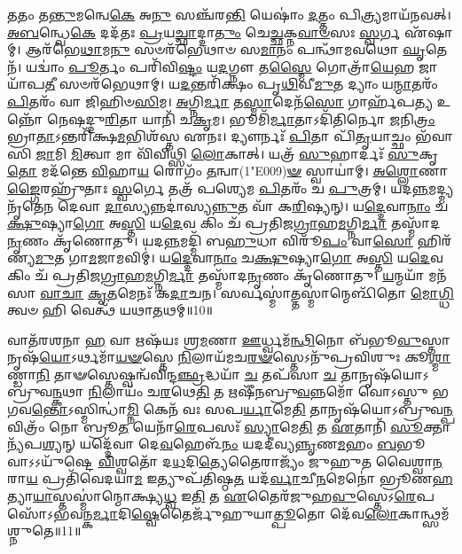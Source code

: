 \-\ul{𑌤}\-𑌤𑌂 𑌤\-\ul{𑌨𑍍𑌤𑍁}\-𑌮𑌨𑍍𑌵𑍇\-\ul{𑌕𑍇} 𑌅\-\ul{𑌨𑍁} 𑌸𑌞𑍍𑌚᳴𑌰\-\ul{𑌨𑍍𑌤𑌿} 𑌯𑍇𑌷𑌾𑌂॑ \ul{𑌦}\-𑌤𑍍𑌤𑌂 𑌪𑌿\-\ul{𑌤𑍍𑌰𑍍𑌯}\-𑌮𑌾𑌯᳴𑌨𑌵𑌤𑍍। 
\-\ul{𑌅}\-\-\ul{𑌬}\-𑌨𑍍𑌧𑍍𑌵𑍇\-\ul{𑌕𑍇} 𑌦𑌦᳴𑌤𑌃 \ul{𑌪𑍍𑌰}\-𑌯\-\ul{𑌚𑍍𑌛𑌾}\-𑌦𑍍𑌦𑌾\-\ul{𑌤𑍁𑌂} 𑌚𑍇\-\ul{𑌚𑍍𑌛}\-𑌕𑍍𑌨\-\ul{𑌵𑌾}\-\-\ul{𑍞}\-𑌸𑌃 \ul{𑌸𑍍𑌵}\-𑌰𑍍𑌗 𑌏᳴𑌷𑌾𑌮𑍍। 
𑌆𑌰᳴𑌭𑍇\-\ul{𑌥𑌾}\-𑌮\-\ul{𑌨𑍁} 𑌸𑍞𑌰᳴𑌭𑍇𑌥𑌾𑍞 𑌸\-\ul{𑌮𑌾}\-𑌨𑌂 𑌪𑌨𑍍𑌥𑌾᳴𑌮𑌵𑌥𑍋 \ul{𑌘𑍃}\-𑌤𑍇𑌨᳴। 
𑌯𑌦𑍍𑌵𑌾𑌂॑ \ul{𑌪𑍂}\-𑌰𑍍𑌤𑌂 𑌪𑌰𑌿᳴𑌵𑌿\-\ul{𑌷𑍍𑌟𑌂} 𑌯\-\ul{𑌦}\-𑌗𑍍𑌨𑍗 𑌤\-\ul{𑌸𑍍𑌮𑍈} 𑌗𑍋𑌤𑍍𑌰𑌾᳴\-\ul{𑌯𑍇}\-𑌹 𑌜𑌾𑌯𑌾᳴𑌪\-\ul{𑌤𑍀} 𑌸𑍞𑌰᳴𑌭𑍇𑌥𑌾𑌮𑍍। 
𑌯\-\ul{𑌦}\-𑌨𑍍𑌤𑌰𑌿᳴𑌕𑍍𑌷𑌂 𑌪𑍃\-\ul{𑌥𑌿}\-𑌵𑍀\-\ul{𑌮𑍁}\-𑌤 𑌦𑍍𑌯𑌾𑌂 𑌯\-\ul{𑌨𑍍𑌮𑌾}\-𑌤𑌰𑌂᳴ \ul{𑌪𑌿}\-𑌤𑌰𑌂᳴ 𑌵𑌾 𑌜𑌿𑌹𑌿𑍞\-\ul{𑌸𑌿}\-𑌮। 
\-\ul{𑌅}\-𑌗𑍍𑌨𑌿\-\ul{𑌰𑍍𑌮𑌾} 𑌤\-\ul{𑌸𑍍𑌮𑌾}\-𑌦𑍇𑌨᳴\-\ul{𑌸𑍋} 𑌗𑌾𑌰𑍍\mbox{}𑌹᳴𑌪\-\ul{𑌤𑍍𑌯} 𑌉𑌨𑍍𑌨𑍋᳴ 𑌨𑍇𑌷𑌦𑍍𑌦𑍁\-\ul{𑌰𑌿}\-𑌤𑌾 𑌯𑌾𑌨𑌿᳴ 𑌚\-\ul{𑌕𑍃}\-𑌮। 
𑌭𑍂𑌮𑌿᳴\-\ul{𑌰𑍍𑌮𑌾}\-𑌤𑌾𑌽𑌦𑌿᳴𑌤𑌿𑌰𑍍𑌨𑍋 \ul{𑌜}\-𑌨𑌿\-\ul{𑌤𑍍𑌰𑌂} 𑌭𑍍𑌰𑌾\-\ul{𑌤𑌾}\-𑌽𑌨𑍍𑌤𑌰𑌿᳴𑌕𑍍𑌷\-\ul{𑌮}\-𑌭𑌿𑌶᳴𑌸𑍍𑌤 𑌏𑌨𑌃। 
𑌦𑍍𑌯𑍗𑌰𑍍𑌨𑌃᳴ \ul{𑌪𑌿}\-𑌤𑌾 𑌪𑌿᳴\-\ul{𑌤𑍃}\-𑌯𑌾𑌚𑍍𑌛𑌂 𑌭᳴𑌵𑌾𑌸𑌿 \ul{𑌜𑌾}\-𑌮𑌿 \ul{𑌮𑌿}\-𑌤𑍍𑌵𑌾 𑌮𑌾 𑌵𑌿᳴𑌵𑌿𑌥𑍍𑌸𑌿 \ul{𑌲𑍋}\-𑌕𑌾𑌤𑍍। 
𑌯𑌤𑍍𑌰᳴ \ul{𑌸𑍁}\-𑌹𑌾𑌰𑍍𑌦𑌃᳴ \ul{𑌸𑍁}\-𑌕𑍃\-\ul{𑌤𑍋} 𑌮𑌦᳴𑌨𑍍𑌤𑍇 \ul{𑌵𑌿}\-𑌹𑌾\-\ul{𑌯} 𑌰𑍋𑌗𑌂᳴ \ul{𑌤}\-𑌨𑍍𑌵𑌾(1\char"E009)\-\ul{𑍟} 𑌸𑍍𑌵𑌾𑌯𑌾॑𑌮𑍍। 
\-\ul{𑌅}\-\-\ul{𑌶𑍍𑌲𑍋}\-𑌣𑌾\-\ul{𑌙𑍍𑌗𑍈}\-𑌰𑌹𑍍𑌰𑍁᳴𑌤𑌾𑌃 \ul{𑌸𑍍𑌵}\-𑌰𑍍𑌗𑍇 𑌤𑌤𑍍𑌰᳴ 𑌪𑌶𑍍𑌯𑍇𑌮 \ul{𑌪𑌿}\-𑌤𑌰𑌂᳴ 𑌚 \ul{𑌪𑍁}\-𑌤𑍍𑌰𑌮𑍍। 
𑌯𑌦\-\ul{𑌨𑍍𑌨}\-𑌮𑌦𑍍𑌮𑍍𑌯𑌨𑍃᳴𑌤𑍇𑌨 𑌦𑍇𑌵𑌾 \ul{𑌦𑌾}\-𑌸𑍍𑌯𑌨𑍍𑌨𑌦𑌾॑𑌸𑍍𑌯\-\ul{𑌨𑍍𑌨𑍁}\-𑌤 𑌵𑌾᳴ 𑌕\-\ul{𑌰𑌿}\-𑌷𑍍𑌯𑌨𑍍। 
𑌯\-\ul{𑌦𑍍𑌦𑍇}\-𑌵𑌾\-\ul{𑌨𑌾𑌂} 𑌚\-\ul{𑌕𑍍𑌷𑍁}\-𑌷𑍍𑌯𑌾\-\ul{𑌗𑍋} 𑌅\-\ul{𑌸𑍍𑌤𑌿} 𑌯\-\ul{𑌦𑍇}\-𑌵 𑌕𑌿𑌂 𑌚᳴ 𑌪𑍍𑌰𑌤𑌿𑌜\-\ul{𑌗𑍍𑌰𑌾}\-𑌹\-\ul{𑌮}\-𑌗𑍍𑌨𑌿\-\ul{𑌰𑍍𑌮𑌾} 𑌤𑌸𑍍𑌮𑌾᳴𑌦\-\ul{𑌨𑍃}\-𑌣𑌂 𑌕𑍃᳴𑌣𑍋𑌤𑍁। 
𑌯𑌦\-\ul{𑌨𑍍𑌨}\-𑌮𑌦𑍍𑌮𑌿᳴ 𑌬\-\ul{𑌹𑍁}\-𑌧𑌾 𑌵𑌿𑌰𑍂᳴\-\ul{𑌪𑌂} 𑌵𑌾\-\ul{𑌸𑍋} 𑌹𑌿𑌰᳴𑌣𑍍𑌯\-\ul{𑌮𑍁}\-𑌤 𑌗𑌾\-\ul{𑌮}\-𑌜𑌾𑌮𑌵𑌿𑌮𑍍॑। 
𑌯\-\ul{𑌦𑍍𑌦𑍇}\-𑌵𑌾\-\ul{𑌨𑌾𑌂} 𑌚\-\ul{𑌕𑍍𑌷𑍁}\-𑌷𑍍𑌯𑌾\-\ul{𑌗𑍋} 𑌅\-\ul{𑌸𑍍𑌤𑌿} 𑌯\-\ul{𑌦𑍇}\-𑌵 𑌕𑌿𑌂 𑌚᳴ 𑌪𑍍𑌰𑌤𑌿𑌜\-\ul{𑌗𑍍𑌰𑌾}\-𑌹\-\ul{𑌮}\-𑌗𑍍𑌨𑌿\-\ul{𑌰𑍍𑌮𑌾} 𑌤𑌸𑍍𑌮𑌾᳴𑌦\-\ul{𑌨𑍃}\-𑌣𑌂 𑌕𑍃᳴𑌣𑍋𑌤𑍁। 
\-\ul{𑌯}\-𑌨𑍍𑌮𑌯𑌾᳴ 𑌮𑌨᳴𑌸𑌾 \ul{𑌵𑌾}\-\-\ul{𑌚𑌾} \ul{𑌕𑍃}\-\-\ul{𑌤}\-𑌮𑍇𑌨𑌃᳴ 𑌕\-\ul{𑌦𑌾}\-𑌚𑌨। 
𑌸𑌰𑍍𑌵𑌸𑍍𑌮𑌾॑𑌤𑍍𑌤𑌸𑍍𑌮𑌾॑𑌨𑍍𑌮𑍇𑌳𑌿᳴𑌤𑍋 \ul{𑌮𑍋}\-\-\ul{𑌗𑍍𑌧𑌿} 𑌤𑍍𑌵𑍞 𑌹𑌿 𑌵𑍇𑌤𑍍𑌥᳴ 𑌯𑌥𑌾\-\ul{𑌤}\-𑌥𑌮𑍍॥10॥\anuvakamend

𑌵𑌾𑌤᳴𑌰𑌶𑌨𑌾 \ul{𑌹} 𑌵𑌾 𑌋𑌷᳴𑌯𑌃 𑌶𑍍𑌰\-\ul{𑌮}\-𑌣𑌾 \ul{𑌊}\-𑌰𑍍𑌧𑍍𑌵𑌮᳴\-\ul{𑌨𑍍𑌥𑌿}\-𑌨𑍋 𑌬᳴𑌭𑍂\-\ul{𑌵𑍁}\-𑌸𑍍𑌤𑌾𑌨𑍃𑌷᳴\-\ul{𑌯𑍋}\-\-𑌽𑌰𑍍𑌥𑌮𑌾᳴\-\ul{𑌯}\-\-\ul{𑍟}\-𑌸𑍍𑌤𑍇 \ul{𑌨𑌿}\-𑌲𑌾𑌯᳴𑌮𑌚\-\ul{𑌰}\-\-\ul{𑍟}\-𑌸𑍍𑌤𑍇𑌽𑌨𑍁᳴𑌪𑍍𑌰𑌵𑌿𑌶𑍁𑌃 𑌕𑍂\-\ul{𑌶𑍍𑌮𑌾}\-𑌣𑍍𑌡𑌾\-\ul{𑌨𑌿} 𑌤𑌾𑍟𑌸𑍍𑌤𑍇𑌷𑍍𑌵𑌨𑍍𑌵᳴𑌵𑌿𑌨𑍍𑌦\-\ul{𑌞𑍍𑌛𑍍𑌰}\-𑌦𑍍𑌧𑌯𑌾᳴ \ul{𑌚} 𑌤𑌪᳴𑌸𑌾 \ul{𑌚} 𑌤𑌾𑌨𑍃𑌷᳴𑌯𑍋𑌽𑌬𑍍𑌰𑍁𑌵\-\ul{𑌨𑍍𑌕}\-𑌥𑌾 \ul{𑌨𑌿}\-𑌲𑌾𑌯𑌂᳴ 𑌚\-\ul{𑌰}\-𑌥𑍇\-\ul{𑌤𑌿} 𑌤 𑌋𑌷𑍀᳴𑌨𑌬𑍍𑌰𑍁\-\ul{𑌵}\-𑌨𑍍𑌨𑌮𑍋᳴ 𑌵𑍋𑌽𑌸𑍍𑌤𑍁 𑌭𑌗𑌵\-\ul{𑌨𑍍𑌤𑍋}\-𑌽𑌸𑍍𑌮𑌿𑌨𑍍𑌧𑌾॑\-\ul{𑌮𑍍𑌨𑌿} 𑌕𑍇𑌨᳴ 𑌵𑌃 𑌸𑌪\-\ul{𑌰𑍍𑌯𑌾}\-𑌮𑍇\-\ul{𑌤𑌿} 𑌤𑌾𑌨𑍃𑌷᳴𑌯𑍋𑌽𑌬𑍍𑌰𑍁𑌵\-\ul{𑌨𑍍𑌪}\-𑌵𑌿𑌤𑍍𑌰𑌂᳴ 𑌨𑍋 𑌬𑍍𑌰𑍂\-\ul{𑌤} 𑌯𑍇𑌨𑌾᳴\-\ul{𑌰𑍇}\-𑌪𑌸𑌃᳴ \ul{𑌸𑍍𑌯𑌾}\-𑌮𑍇\-\ul{𑌤𑌿} 𑌤 \ul{𑌏}\-𑌤𑌾𑌨𑌿᳴ \ul{𑌸𑍂}\-𑌕𑍍𑌤𑌾𑌨𑍍𑌯᳴𑌪\-\ul{𑌶𑍍𑌯}\-𑌨𑍍 𑌯𑌦𑍍𑌦𑍇᳴𑌵𑌾 𑌦𑍇\-\ul{𑌵}\-𑌹𑍇𑌳᳴\-\ul{𑌨𑌂} 𑌯𑌦𑌦𑍀॑𑌵𑍍𑌯\-\ul{𑌨𑍍𑌨𑍃}\-𑌣\-\ul{𑌮}\-𑌹𑌂 \ul{𑌬}\-𑌭𑍂𑌵𑌾𑌽𑌽𑌯𑍁᳴𑌷𑍍𑌟𑍇 \ul{𑌵𑌿}\-𑌶𑍍𑌵𑌤𑍋᳴ 𑌦\-\ul{𑌧}\-𑌦𑌿\-\ul{𑌤𑍍𑌯𑍇}\-𑌤𑍈𑌰𑌾𑌜𑍍𑌯𑌂᳴ 𑌜𑍁𑌹𑍁𑌤 𑌵𑍈𑌶𑍍𑌵𑌾\-\ul{𑌨}\-𑌰𑌾\-\ul{𑌯} 𑌪𑍍𑌰𑌤𑌿᳴𑌵𑍇𑌦𑌯𑌾\-\ul{𑌮} 𑌇𑌤𑍍𑌯𑍁𑌪᳴𑌤𑌿𑌷𑍍𑌠\-\ul{𑌤} 𑌯𑌦᳴\-\ul{𑌰𑍍𑌵𑌾}\-𑌚𑍀\-\ul{𑌨}\-𑌮𑍇𑌨𑍋॑ 𑌭𑍍𑌰𑍂𑌣\-\ul{𑌹}\-𑌤𑍍𑌯𑌾\-\ul{𑌯𑌾}\-\-𑌸𑍍𑌤𑌸𑍍𑌮𑌾॑𑌨𑍍𑌮𑍋𑌕𑍍𑌷𑍍𑌯\-\ul{𑌧𑍍𑌵} 𑌇\-\ul{𑌤𑌿} 𑌤 \ul{𑌏}\-𑌤𑍈𑌰᳴𑌜𑍁𑌹\-\ul{𑌵𑍁}\-𑌸𑍍𑌤𑍇𑌽\-\ul{𑌰𑍇}\-𑌪𑌸𑍋᳴\-𑌽𑌭𑌵𑌨𑍍𑌕\-\ul{𑌰𑍍𑌮𑌾}\-𑌦𑌿\-\ul{𑌷𑍍𑌵𑍇}\-𑌤𑍈𑌰𑍍𑌜𑍁᳴𑌹𑍁𑌯𑌾\-\ul{𑌤𑍍𑌪𑍂}\-𑌤𑍋 𑌦𑍇᳴𑌵\-\ul{𑌲𑍋}\-𑌕𑌾𑌨𑍍𑌥𑍍𑌸𑌮᳴𑌶𑍍𑌨𑍁𑌤𑍇॥11॥\anuvakamend


